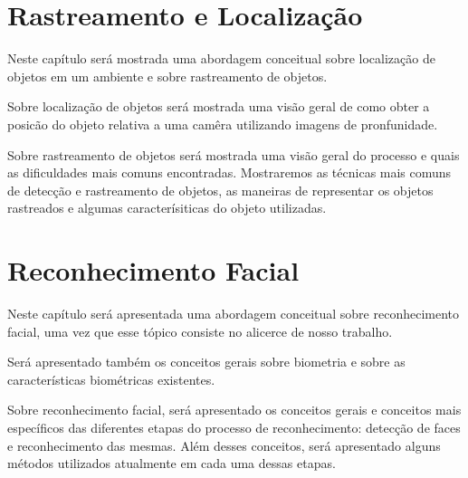 \chapter{Rastreamento e Localização}

	Neste capítulo será mostrada uma abordagem conceitual sobre localização de objetos em um ambiente e sobre rastreamento de objetos.

	Sobre localização de objetos será mostrada uma visão geral de como obter a posicão do objeto relativa a uma camêra utilizando imagens de pronfunidade.

	Sobre rastreamento de objetos será mostrada uma visão geral do processo e quais as dificuldades mais comuns encontradas. Mostraremos as técnicas mais comuns de detecção e rastreamento de objetos, as maneiras de representar os objetos rastreados e algumas caracterísiticas do objeto utilizadas.

	
	
	

\chapter{Reconhecimento Facial}

	Neste capítulo será apresentada uma abordagem conceitual sobre reconhecimento facial, uma vez que esse tópico consiste no alicerce de nosso trabalho. 

	Será apresentado também os conceitos gerais sobre biometria e sobre as características biométricas existentes.

	Sobre reconhecimento facial, será apresentado os conceitos gerais e conceitos mais específicos das diferentes etapas do processo de reconhecimento: detecção de faces e reconhecimento das mesmas. Além desses conceitos, será apresentado alguns métodos utilizados atualmente em cada uma dessas etapas.


	
	































